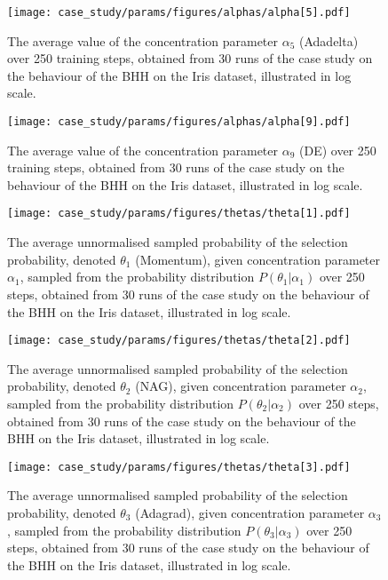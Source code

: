 \begin{figure}[htpb]
	\centering
	\texttt{[image: case\_study/params/figures/alphas/alpha[5].pdf]}
	\caption{The average value of the concentration parameter $\alpha_{5}$ (\acs{Adadelta}) over 250 training steps, obtained from 30 runs of the case study on the behaviour of the \acs{BHH} on the Iris dataset, illustrated in log scale.}
	\label{fig:app:case_study_additional:alpha:5}
\end{figure}

\begin{figure}[htpb]
	\centering
	\texttt{[image: case\_study/params/figures/alphas/alpha[9].pdf]}
	\caption{The average value of the concentration parameter $\alpha_{9}$ (\acs{DE}) over 250 training steps, obtained from 30 runs of the case study on the behaviour of the \acs{BHH} on the Iris dataset, illustrated in log scale.}
	\label{fig:app:case_study_additional:alpha:9}
\end{figure}



\begin{figure}[htpb]
	\centering
	\texttt{[image: case\_study/params/figures/thetas/theta[1].pdf]}
	\caption{The average unnormalised sampled probability of the selection probability, denoted $\theta_{1}$ (\acs{Momentum}), given concentration parameter $\alpha_{1}$, sampled from the probability distribution $P(\theta_{1} \vert \alpha_{1})$ over 250 steps, obtained from 30 runs of the case study on the behaviour of the \acs{BHH} on the Iris dataset, illustrated in log scale.}
	\label{fig:app:case_study_additional:theta:1}
\end{figure}

\begin{figure}[htpb]
	\centering
	\texttt{[image: case\_study/params/figures/thetas/theta[2].pdf]}
	\caption{The average unnormalised sampled probability of the selection probability, denoted $\theta_{2}$ (\acs{NAG}), given concentration parameter $\alpha_{2}$, sampled from the probability distribution $P(\theta_{2} \vert \alpha_{2})$ over 250 steps, obtained from 30 runs of the case study on the behaviour of the \acs{BHH} on the Iris dataset, illustrated in log scale.}
	\label{fig:app:case_study_additional:theta:2}
\end{figure}

\begin{figure}[htpb]
	\centering
	\texttt{[image: case\_study/params/figures/thetas/theta[3].pdf]}
	\caption{The average unnormalised sampled probability of the selection probability, denoted $\theta_{3}$ (\acs{Adagrad}), given concentration parameter $\alpha_{3}$, sampled from the probability distribution $P(\theta_{3} \vert \alpha_{3})$ over 250 steps, obtained from 30 runs of the case study on the behaviour of the \acs{BHH} on the Iris dataset, illustrated in log scale.}
	\label{fig:app:case_study_additional:theta:3}
\end{figure}

